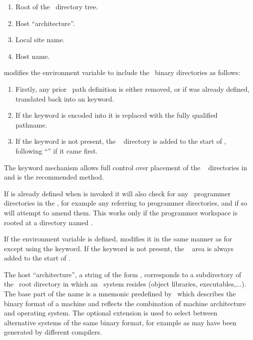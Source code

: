 \begin{enumerate}
\item
   Root of the \aipspp\ directory tree.

\item
   Host ``architecture''.

\item
   Local site name.

\item
   Host name.

\end{enumerate}

 modifies the  environment variable to include the
\aipspp\ binary directories as follows:

\begin{enumerate}

\item
   Firstly, any prior \aipspp\ path definition is either removed, or if
    was already defined, translated back into an
    keyword.

\item
   If the keyword  is encoded into  it is replaced
   with the fully qualified pathname.

\item
   If the  keyword is not present, the \aipspp\ 
   directory is added to the start of , following ``'' if
   it came first.

\end{enumerate}

The keyword mechanism allows full control over placement of the \aipspp\ 
 directories in  and is the recommended method.

If  is already defined when  is invoked it will
also check for any \aipspp\ programmer directories in the \code{PATH}, for
example any referring to programmer \file{bin} directories, and if so will
attempt to amend them.  This works only if the programmer workspace is rooted
at a directory named \file{aips++}.

If the  environment variable is defined,  modifies
it in the same manner as for \code{PATH} except using the 
keyword.  If the \code{aips\_doc} keyword is not present, the \aipspp\ 
 area is always added to the start of .

The host ``architecture'', a string of the form ,
corresponds to a subdirectory of the \aipspp\ root directory in which an
\aipspp\ system resides (object libraries, executables,...).  The base part of
the name is a mnemonic predefined by \aipspp\ which describes the binary
format of a machine and reflects the combination of machine architecture and
operating system.  The optional extension is used to select between
alternative systems of the same binary format, for example as may have been
generated by different compilers.

